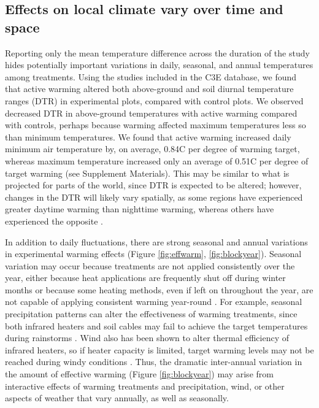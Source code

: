 \documentclass{article}
\begin{document}
\subsection* {Effects on local climate vary over time and space}
Reporting only the mean temperature difference across the duration of the study hides potentially important variations in daily, seasonal, and annual temperatures among treatments. Using the studies included in the C3E database, we found that active warming altered both above-ground and soil diurnal temperature ranges (DTR) in experimental plots, compared with control plots. We observed decreased DTR in above-ground temperatures with active warming compared with controls, perhaps because warming affected maximum temperatures less so than minimum temperatures. We found that active warming increased daily minimum air temperature by, on average, 0.84\degree C per degree of warming target, whereas maximum temperature increased only an average of 0.51\degree C per degree of target warming (see Supplement Materials). This may be similar to what is projected for parts of the world, since DTR is expected to be altered; however, changes in the DTR will likely vary spatially, as some regions have experienced greater daytime warming than nighttime warming, whereas others have experienced the opposite \citep{ipcc2013}. 
\par In addition to daily fluctuations, there are strong seasonal and annual variations in experimental warming effects (Figure \ref{fig:effwarm}, \ref{fig:blockyear}). Seasonal variation may occur because treatments are not applied consistently over the year, either because heat applications are frequently shut off during winter months or because some heating methods, even if left on throughout the year, are not capable of applying consistent warming year-round \citep[e.g.][]{clark2014a,clark2014b,hagedorn2010}. For example, seasonal precipitation patterns can alter the effectiveness of warming treatments, since both infrared heaters and soil cables may fail to achieve the target temperatures during rainstorms \citep{peterjohn1993,hoeppner2012}. Wind also has been shown to alter thermal efficiency of infrared heaters, so if heater capacity is limited, target warming levels may not be reached during windy conditions \citep{kimball2005,kimball2008}. Thus, the dramatic inter-annual variation in the amount of effective warming (Figure \ref{fig:blockyear}) may arise from interactive effects of warming treatments and precipitation, wind, or other aspects of weather that vary annually, as well as seasonally. 
\end{document}
